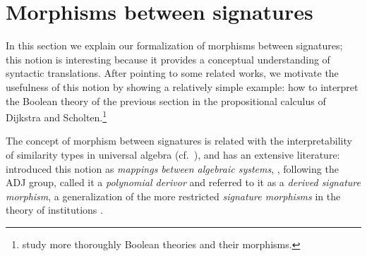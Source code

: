 \section{Morphisms between signatures}
\label{sec:trans}
In this section we explain our formalization of morphisms between
signatures; this notion is interesting because it provides a
conceptual understanding of syntactic translations. After pointing to
some related works, we motivate the usefulness of this notion by
showing a relatively simple example: how to interpret the Boolean
theory of the previous section in the propositional calculus of
Dijkstra and Scholten.\footnote{\cite{rocha-2007}
  study more thoroughly Boolean theories and their morphisms.}

The concept of morphism between signatures is related with the
interpretability of similarity types in universal algebra
(cf.~\cite{garcia-84}), and has an extensive literature:
~\cite{fujiwara-1959} introduced this notion as
\textit{mappings between algebraic systems},
\cite{janssen-98}, following the ADJ group, called it a
\textit{polynomial derivor} and \cite{mossakowski-15}
referred to it as a \textit{derived signature morphism}, a generalization
of the more restricted \textit{signature morphisms} in the theory of
institutions \citep{goguen-92}.

